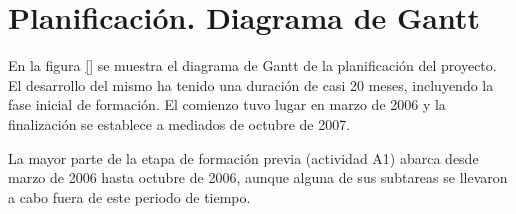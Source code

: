 
\chapter{Planificación. Diagrama de Gantt}\label{gantt}

En la figura \ref{} se muestra el diagrama de Gantt de la planificación del proyecto. El desarrollo del mismo ha tenido una duración de casi 20 meses, incluyendo la fase inicial de formación. El comienzo tuvo lugar en marzo de 2006 y la finalización se establece a mediados de octubre de 2007.

La mayor parte de la etapa de formación previa (actividad A1) abarca desde marzo de 2006 hasta octubre de 2006, aunque alguna de sus subtareas se llevaron a cabo fuera de este periodo de tiempo.